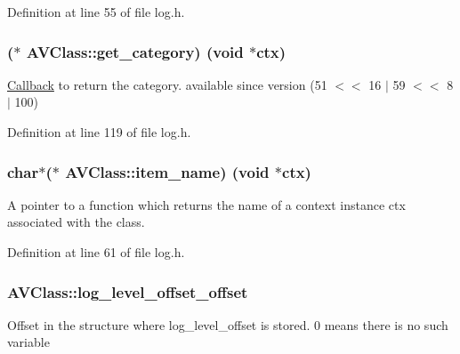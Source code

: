 Definition at line 55 of file log.\+h.

\subsubsection[{\texorpdfstring{get\+\_\+category}{get_category}}]{($\ast$ A\+V\+Class\+::get\+\_\+category) ({\bf void} $\ast$ctx)}\hypertarget{struct_a_v_class_a511382185d3206043d5d37c1007f199c}{}\label{struct_a_v_class_a511382185d3206043d5d37c1007f199c}
\hyperlink{class_callback}{Callback} to return the category. available since version (51 $<$$<$ 16 $\vert$ 59 $<$$<$ 8 $\vert$ 100) 

Definition at line 119 of file log.\+h.

\subsubsection[{\texorpdfstring{item\+\_\+name}{item_name}}]{ char$\ast$($\ast$ A\+V\+Class\+::item\+\_\+name) ({\bf void} $\ast$ctx)}\hypertarget{struct_a_v_class_ad763b2e6a0846234a165e74574a550bd}{}\label{struct_a_v_class_ad763b2e6a0846234a165e74574a550bd}
A pointer to a function which returns the name of a context instance ctx associated with the class. 

Definition at line 61 of file log.\+h.

\subsubsection[{\texorpdfstring{log\+\_\+level\+\_\+offset\+\_\+offset}{log_level_offset_offset}}]{ A\+V\+Class\+::log\+\_\+level\+\_\+offset\+\_\+offset}\hypertarget{struct_a_v_class_afbde6320c22278fac43732f7410b66e7}{}\label{struct_a_v_class_afbde6320c22278fac43732f7410b66e7}
Offset in the structure where log\+\_\+level\+\_\+offset is stored. 0 means there is no such variable 

